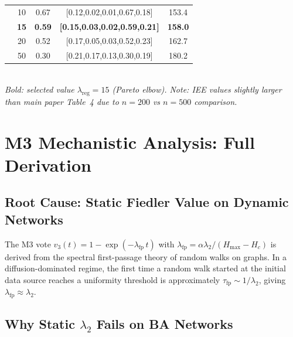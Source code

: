 \documentclass[review,12pt]{elsarticle}
\newcommand{\Hc}{H_c}
\newcommand{\Hmax}{H_{\max}}
\newcommand{\lambdat}{\lambda_2}
\begin{document}
\begin{table}[htbp]
\begin{tabular}{ccccc}
      & 10  & 0.67 & [0.12,0.02,0.01,0.67,0.18] & 153.4 \\
      & \textbf{15} & \textbf{0.59} & \textbf{[0.15,0.03,0.02,0.59,0.21]} & \textbf{158.0} \\
      & 20  & 0.52 & [0.17,0.05,0.03,0.52,0.23] & 162.7 \\
      & 50  & 0.30 & [0.21,0.17,0.13,0.30,0.19] & 180.2 \\
    \bottomrule
  \end{tabular}
  \medskip\\
  \small\textit{Bold: selected value $\lambda_{\mathrm{reg}}=15$ (Pareto elbow).
  Note: IEE values slightly larger than main paper Table~4 due to $n=200$
  vs $n=500$ comparison.}
\end{table}

\section{M3 Mechanistic Analysis: Full Derivation}
\label{sec:S_m3}

\subsection{Root Cause: Static Fiedler Value on Dynamic Networks}

The M3 vote $v_3(t) = 1 - \exp(-\lambda_{\mathrm{fp}}\,t)$ with
$\lambda_{\mathrm{fp}} = \alpha\lambdat/(\Hmax - \Hc)$ is derived from
the spectral first-passage theory of random walks on graphs.  In a
diffusion-dominated regime, the first time a random walk started at the
initial data source reaches a uniformity threshold is approximately
$\tau_{\mathrm{fp}} \sim 1/\lambdat$, giving $\lambda_{\mathrm{fp}} \approx \lambdat$.

\subsection{Why Static $\lambdat$ Fails on BA Networks}
\end{document}
